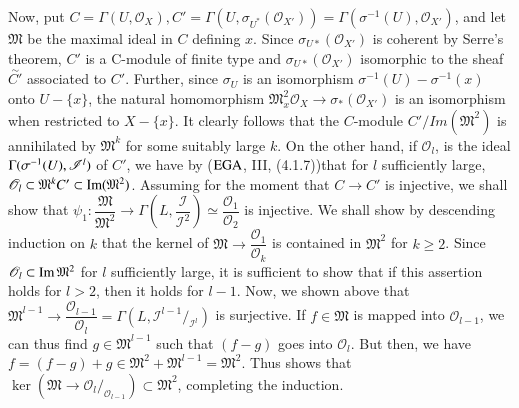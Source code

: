  Now, put $C= \Gamma (U, \mathscr{O}_X), C'= \Gamma (U,
 \sigma_{U^*}(\mathscr{O}_{X'}))= \Gamma (\sigma^{-1}(U),
 \mathscr{O}_{X'})$, and let $\mathfrak{M}$ be the maximal ideal in $C$
 defining $x$. Since $\sigma_{U*}(\mathscr{O}_{X'})$ is coherent by
 Serre's theorem, $C'$ is a C-module of finite type and
 $\sigma_{U*}(\mathscr{O}_{X'})$ isomorphic to the sheaf
 $\overset{\sim}{C'}$ associated to $C'$. Further, since $\sigma_U$ is
 an isomorphism $\sigma^{-1}(U)- \sigma^{-1}(x)$ onto $U- \{x\}$, the
 natural homomorphism $\mathfrak{M}^2_x \mathscr{O}_X \to \sigma_*(
 \mathscr{O}_{X'})$ is an isomorphism when restricted to $X -
 \{x\}$. It clearly follows that the $C$-module  $C'/Im(\mathfrak{M}^2)$
 is annihilated by $\mathfrak{M}^k$ for some suitably large $k$. On the
 other hand, if $\mathscr{O}_l$, is the ideal $\Gamma(\sigma^{-1}(U),\break
 \mathscr{I}^l)$ of $C'$, we have by ($\operatorname{EGA}$, III,
 (4.1.7))\pageoriginale  that for 
 $l$ sufficiently large, $\mathscr{O}_l \subset \mathfrak{M}^k C'
 \subset \operatorname{Im} (\mathfrak{M}^2)$. Assuming for the moment that $C
 \rightarrow C'$ is injective, we shall show that $\psi_1:
 \dfrac{\mathfrak{M}}{\mathfrak{M}^2} \to \Gamma \left(L,
 \dfrac{\mathscr{I}}{\mathscr{I}^2}\right) \simeq
 \dfrac{\mathscr{O}_1}{\mathscr{O}_2}$ is injective. We shall show by
 descending induction on $k$ that the kernel of $\mathfrak{M} \to
 \dfrac{\mathscr{O}_1}{\mathscr{O}_k}$ is contained in $\mathfrak{M}^2$
 for $k \ge 2$. Since $\mathscr{O}_l \subset \operatorname{Im} \mathfrak{M}^2$ for $l$
 sufficiently large, it is sufficient to show that if this assertion
 holds for $l > 2$, then it holds for $l-1$. Now, we shown above that
 $\mathfrak{M}^{l-1} \to \dfrac{\mathscr{O}_{l-1}}{\mathscr{O}_l}=
 \Gamma (L, \mathscr{I}^{l-1}/_{\mathscr{I}^l})$ is surjective. If $f
 \in \mathfrak{M}$ is mapped into $\mathscr{O}_{l-1}$, we can thus find
 $g \in \mathfrak{M}^{l-1}$ such that $(f-g)$ goes into
 $\mathscr{O}_l$. But then, we have $f=(f-g)+ g \in \mathfrak{M}^2 +
 \mathfrak{M}^{l-1}= \mathfrak{M}^2$. Thus shows that $\ker (
 \mathfrak{M}\to \mathscr{O}_l / _{\mathscr{O}_{l-1}}) \subset
 \mathfrak{M}^2$, completing the induction. 
 
